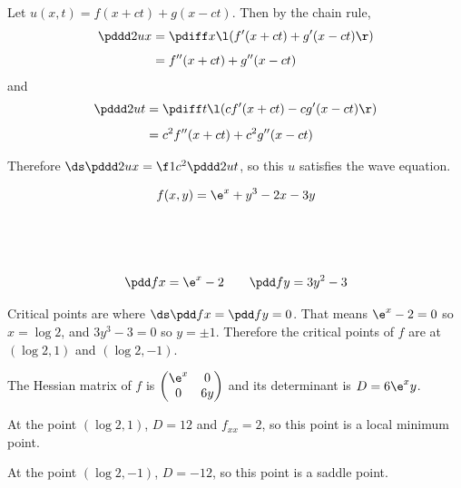 \documentclass[a4paper]{article}
\begin{document}
Let $u(x, t) = f(x+ct) + g(x-ct)$. Then by the chain rule, \begin{align*}
\pddd 2ux &= \pdiff x \l( f'(x+ct) + g'(x-ct) \r)\\[1ex]
&= f''(x+ct) + g''(x-ct)
\end{align*}
and \begin{align*}
\pddd 2ut &= \pdiff t \l( c f'(x+ct) - c g'(x-ct) \r)\\[1ex]
&= c^2 f''(x+ct) + c^2 g''(x-ct)
\end{align*}

Therefore $\ds \pddd 2ux = \f1{c^2} \pddd 2ut$, so this $u$ satisfies the wave equation.


$$f(x, y) = \e^x + y^3 - 2x - 3y$$

\subsection{~}

$$\pdd fx = \e^x - 2 \qquad \pdd fy = 3y^2 - 3$$

Critical points are where $\ds \pdd fx = \pdd fy = 0$. That means $\e^x - 2 = 0$ so $x = \log 2$, and $3y^3 - 3 = 0$ so $y = \pm 1$. Therefore the critical points of $f$ are at $(\log 2, 1)$ and $(\log 2, -1)$.

The Hessian matrix of $f$ is $\begin{pmatrix} \e^x & 0\\ 0 & 6y \end{pmatrix}$ and its determinant is $D = 6 \e^x y$.

At the point $(\log 2, 1)$, $D = 12$ and $f_{xx} = 2$, so this point is a local minimum point.

At the point $(\log 2, -1)$, $D = -12$, so this point is a saddle point.

\subsection{~}
\end{document}
